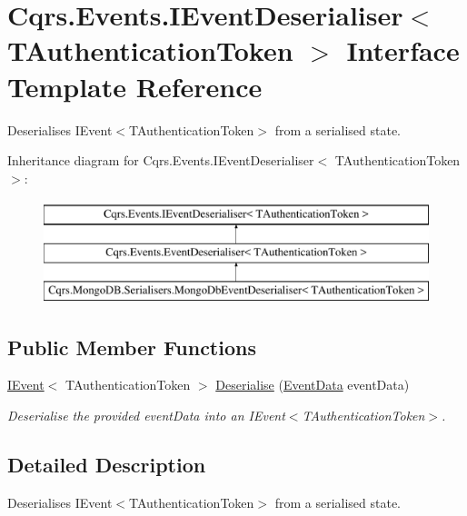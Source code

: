 \hypertarget{interfaceCqrs_1_1Events_1_1IEventDeserialiser}{}\section{Cqrs.\+Events.\+I\+Event\+Deserialiser$<$ T\+Authentication\+Token $>$ Interface Template Reference}
\label{interfaceCqrs_1_1Events_1_1IEventDeserialiser}


Deserialises I\+Event$<$\+T\+Authentication\+Token$>$ from a serialised state.  


Inheritance diagram for Cqrs.\+Events.\+I\+Event\+Deserialiser$<$ T\+Authentication\+Token $>$\+:\begin{figure}[H]
\begin{center}
\leavevmode
\includegraphics[height=3.000000cm]{interfaceCqrs_1_1Events_1_1IEventDeserialiser}
\end{center}
\end{figure}
\subsection*{Public Member Functions}
\begin{DoxyCompactItemize}
\item 
\hyperlink{interfaceCqrs_1_1Events_1_1IEvent}{I\+Event}$<$ T\+Authentication\+Token $>$ \hyperlink{interfaceCqrs_1_1Events_1_1IEventDeserialiser_af9216046631ed941bb96b58a0cc27f22_af9216046631ed941bb96b58a0cc27f22}{Deserialise} (\hyperlink{classCqrs_1_1Events_1_1EventData}{Event\+Data} event\+Data)
\begin{DoxyCompactList}\small\item\em Deserialise the provided {\itshape event\+Data}  into an I\+Event$<$\+T\+Authentication\+Token$>$. \end{DoxyCompactList}\end{DoxyCompactItemize}


\subsection{Detailed Description}
Deserialises I\+Event$<$\+T\+Authentication\+Token$>$ from a serialised state. 


